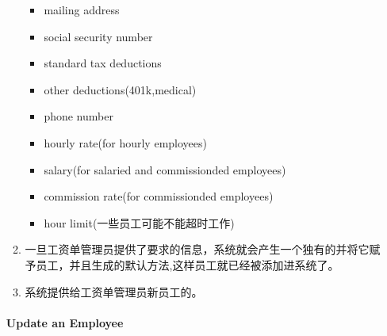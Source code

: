 \documentclass{article}
\begin{document}
\begin{enumerate}
\begin{enumerate}
\begin{itemize}[noitemsep,topsep=\mdcompacttopsep]
\item{}mailing address%

\item{}social security number%

\item{}standard tax deductions%

\item{}other deductions(401k,medical)%

\item{}phone number%

\item{}hourly rate(for hourly employees)%

\item{}salary(for salaried and commissionded employees)%

\item{}commission rate(for commissionded employees)%

\item{}hour limit(一些员工可能不能超时工作)%
\end{itemize}%

\item{}
一旦工资单管理员提供了要求的信息，系统就会产生一个独有的并将它赋予员工，并且生成的默认方法,这样员工就已经被添加进系统了。%

\item{}
系统提供给工资单管理员新员工的。%
\end{enumerate}%

\paragraph{Update an Employee}\label{sec-update-an-employee}%

\begin{enumerate}[noitemsep,topsep=\mdcompacttopsep]%


\end{enumerate}
\end{enumerate}
\end{document}
